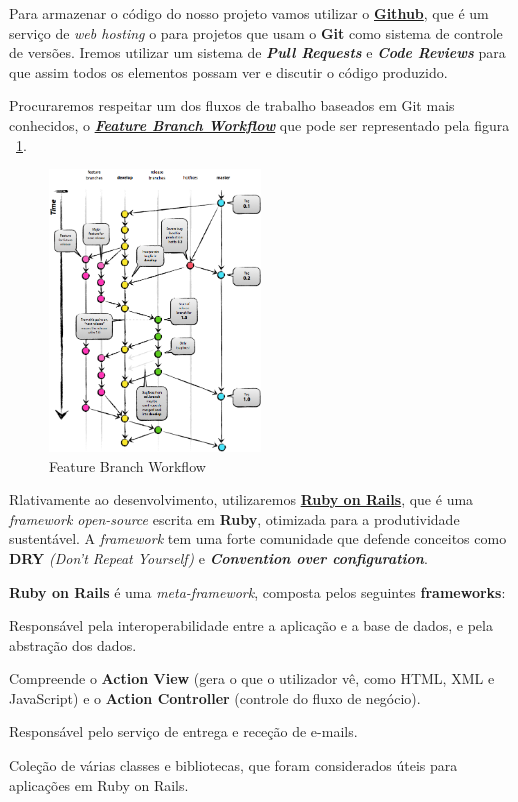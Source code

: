 Para armazenar o código do nosso projeto vamos utilizar o \href{http://github.com}{\textbf{Github}}, que é um serviço de \textit{web hosting} o para projetos que usam o \textbf{Git} como sistema de controle de versões. Iremos utilizar um sistema de \textit{\textbf{Pull Requests}} e \textit{\textbf{Code Reviews}} para que assim todos os elementos possam ver e discutir o código produzido.

Procuraremos respeitar um dos fluxos de trabalho baseados em Git mais conhecidos, o \href{https://www.atlassian.com/git/workflows#!workflow-feature-branch}{\textbf{\textit{Feature Branch Workflow}}} que pode ser representado pela figura ~\ref{fig:git-workflow}.

\begin{figure}[H] 
  \centering
  \includegraphics[width=0.5\textwidth]{images/tecnologias/git-workflow}
  \caption{Feature Branch Workflow}
  \label{fig:git-workflow}
\end{figure}

Rlativamente ao desenvolvimento, utilizaremos \href{http://rubyonrails.org/}{\textbf{Ruby on Rails}}, que é uma \textit{framework open-source} escrita em \textbf{Ruby}, otimizada para a produtividade sustentável. A \textit{framework} tem uma forte comunidade que defende conceitos como \textbf{DRY} \textit{(Don't Repeat Yourself)} e \textbf{\textit{Convention over configuration}}.

\textbf{Ruby on Rails} é uma \textit{meta-framework}, composta pelos seguintes \textbf{frameworks}:

\begin{description}[labelindent=1cm]
  \item[Active Record] Responsável pela interoperabilidade entre a aplicação e a base de dados, e pela abstração dos dados.
  \item[Action Pack] Compreende o \textbf{Action View} (gera o que o utilizador vê, como HTML, XML e JavaScript) e o \textbf{Action Controller} (controle do fluxo de negócio).
  \item[Action Mailer] Responsável pelo serviço de entrega e receção de e-mails.
  \item[Active Support] Coleção de várias classes e bibliotecas, que foram considerados úteis para aplicações em Ruby on Rails.
\end{description}

